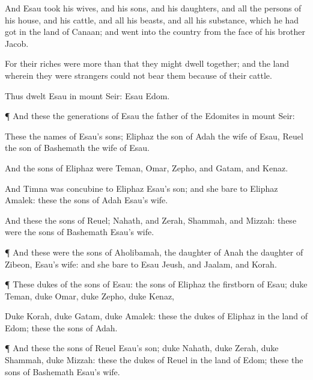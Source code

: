 {And
Esau
took his
wives, and his
sons, and his
daughters, and all the
persons of his
house, and his
cattle, and all his
beasts, and all his
substance, which he had
got in the
land of
Canaan; and
went into the
country from the
face of his
brother
Jacob.

For their
riches were
more than that they might
dwell
together; and the
land wherein they were
strangers
could not
bear them
because of their
cattle.

Thus
dwelt
Esau in
mount
Seir:
Esau
{}
Edom.


\par }{\PP {}¶ And these
{} the
generations of
Esau the
father of the
Edomites in
mount
Seir:

These
{} the
names of
Esau’s
sons;
Eliphaz the
son of
Adah the
wife of
Esau,
Reuel the
son of
Bashemath the
wife of
Esau.

And the
sons of
Eliphaz were
Teman,
Omar,
Zepho, and
Gatam, and
Kenaz.

And
Timna was
concubine to
Eliphaz
Esau’s
son; and she
bare to
Eliphaz
Amalek: these
{} the
sons of
Adah
Esau’s
wife.

And these
{} the
sons of
Reuel;
Nahath, and
Zerah,
Shammah, and
Mizzah: these were the
sons of
Bashemath
Esau’s
wife.


\par }{\PP {}¶ And these were the
sons of
Aholibamah, the
daughter of
Anah the
daughter of
Zibeon,
Esau’s
wife: and she
bare to
Esau
Jeush, and
Jaalam, and
Korah.


\par }{\PP {}¶ These
{}
dukes of the
sons of
Esau: the
sons of
Eliphaz the
firstborn
{} of
Esau;
duke
Teman,
duke
Omar,
duke
Zepho,
duke
Kenaz,

Duke
Korah,
duke
Gatam,
{}
duke
Amalek: these
{} the
dukes
{} of
Eliphaz in the
land of
Edom; these
{} the
sons of
Adah.


\par }{\PP {}¶ And these
{} the
sons of
Reuel
Esau’s
son;
duke
Nahath,
duke
Zerah,
duke
Shammah,
duke
Mizzah: these
{} the
dukes
{} of
Reuel in the
land of
Edom; these
{} the
sons of
Bashemath
Esau’s
wife.


}
